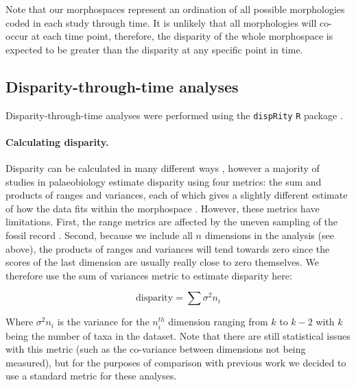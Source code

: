 \documentclass[12pt,a4paper]{article}
\begin{document}
Note that our morphospaces represent an ordination of all possible morphologies coded in each study through time.
It is unlikely that all morphologies will co-occur at each time point, therefore, the disparity of the whole morphospace is expected to be greater than the disparity at any specific point in time.

\subsection{Disparity-through-time analyses}

Disparity-through-time analyses were performed using the \texttt{dispRity} \texttt{R} package \citep{dispRity.v02}. 

\paragraph{Calculating disparity.}
\label{disparity_calc}
Disparity can be calculated in many different ways \citep[e.g.][]{Wills1994,Ciampaglio2004,thorneresetting2011,hopkinsdecoupling2013,huang2015origins}, however a majority of studies in palaeobiology estimate disparity using four metrics: the sum and products of ranges and variances, each of which gives a slightly different estimate of how the data fits within the morphospace \citep{Foote01071994,Wills1994,brusatte50,Brusatte12092008,cisneros2010,thorneresetting2011,prentice2011,brusattedinosaur2012,toljagictriassic-jurassic2013,ruta2013,bentonmodels2014,bensonfaunal2014}.
However, these metrics have limitations. 
First, the range metrics are affected by the uneven sampling of the fossil record \citep{Butler2012}.
Second, because we include all $n$ dimensions in the analysis (see above), the products of ranges and variances will tend towards zero since the scores of the last dimension are usually really close to zero themselves. 
We therefore use the sum of variances metric to estimate disparity here:

\begin{equation}
\text{disparity} = \sum\sigma^{2}{n_i}
\end{equation}

Where $\sigma^{2}{n_i}$ is the variance for the $n_i^{th}$ dimension ranging from $k$ to $k-2$ with $k$ being the number of taxa in the dataset.
Note that there are still statistical issues with this metric (such as the co-variance between dimensions not being measured), but for the purposes of comparison with previous work we decided to use a standard metric for these analyses.
\end{document}

